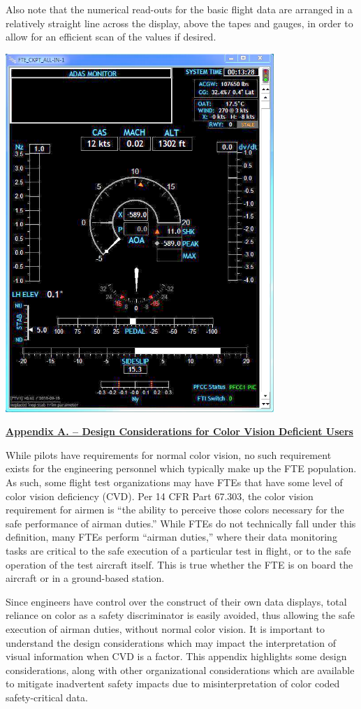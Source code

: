 \documentclass[
]{book}
\begin{document}
Also note that the numerical read-outs for the basic flight data are arranged in a relatively straight line across the display, above the tapes and gauges, in order to allow for an efficient scan of the values if desired.

\includegraphics[width=4.00486in,height=5.34236in]{media/21/image13.png}

\textbf{\underline{Appendix A. -- Design Considerations for Color Vision Deficient Users}}

While pilots have requirements for normal color vision, no such requirement exists for the engineering personnel which typically make up the FTE population. As such, some flight test organizations may have FTEs that have some level of color vision deficiency (CVD). Per 14 CFR Part 67.303, the color vision requirement for airmen is ``the ability to perceive those colors necessary for the safe performance of airman duties.'' While FTEs do not technically fall under this definition, many FTEs perform ``airman duties,'' where their data monitoring tasks are critical to the safe execution of a particular test in flight, or to the safe operation of the test aircraft itself. This is true whether the FTE is on board the aircraft or in a ground-based station.

Since engineers have control over the construct of their own data displays, total reliance on color as a safety discriminator is easily avoided, thus allowing the safe execution of airman duties, without normal color vision. It is important to understand the design considerations which may impact the interpretation of visual information when CVD is a factor. This appendix highlights some design considerations, along with other organizational considerations which are available to mitigate inadvertent safety impacts due to misinterpretation of color coded safety-critical data.
\end{document}
